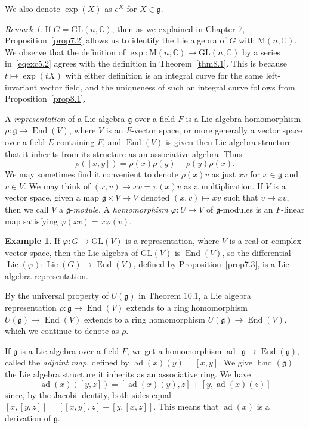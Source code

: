 \documentclass[12pt,reqno]{book}%
\theoremstyle{definition}
\newtheorem{example}{Example}[chapter]
\theoremstyle{remark}
\newtheorem{remark}[theorem]{Remark}
\theoremstyle{theorem}
\theoremstyle{remark}
\DeclareMathOperator{\End}{End}
\DeclareMathOperator{\Lie}{Lie}
\DeclareMathOperator{\ad}{ad}
\begin{document}
We also denote $\exp(X)$ as $e^X$ for $X \in \mathfrak{g}$.

\begin{remark}\label{}%
    If $G = \mathrm{GL}(n, \mathbb{C})$, then as we explained in Chapter 7, Proposition~\ref{prop7.2} allows us to identify the Lie algebra of $G$ with $\mathrm{M}(n, \mathbb{C})$.
    We observe that the definition of $\exp : \mathrm{M}(n, \mathbb{C}) \to \mathrm{GL}(n, \mathbb{C})$ by a series in~\eqref{eqexc5.2} agrees with the definition in Theorem~\ref{thm8.1}.
    This is because $t \mapsto \exp(tX)$ with either definition is an integral curve for the same left-invariant vector field, and the uniqueness of such an integral curve follows from Proposition~\ref{prop8.1}.
\end{remark}%

A \emph{representation} of a Lie algebra $\mathfrak{g}$ over a field $F$ is a Lie algebra homomorphism $\rho : \mathfrak{g} \to \End(V)$, where $V$ is an $F$-vector space, or more generally a vector space over a field $E$ containing $F$, and $\End(V)$ is given then Lie algebra structure that it inherits from its structure as an associative algebra.
Thus
\[
    \rho([x, y]) = \rho(x)\rho(y) - \rho(y)\rho(x).
\]
We may sometimes find it convenient to denote $\rho(x)v$ as just $xv$ for $x \in \mathfrak{g}$ and $v \in V$.
We may think of $(x, v) \mapsto xv = \pi(x)v$ as a multiplication.
If $V$ is a vector space, given a map $\mathfrak{g} \times V \to V$ denoted $(x, v) \mapsto xv$ such that $v \to xv$, then we call $V$ a $\mathfrak{g}$-\emph{module}.
A \emph{homomorphism} $\varphi : U \to V$ of $\mathfrak{g}$-modules is an $F$-linear map satisfying $\varphi(xv) = x\varphi(v)$.

\begin{example}\label{}
    If $\varphi : G \to \mathrm{GL}(V)$ is a representation, where $V$ is a real or complex vector space, then the Lie algebra of $\mathrm{GL}(V)$ is $\End(V)$, so the differential $\Lie(\varphi) : \Lie(G) \to \End(V)$, defined by Proposition~\ref{prop7.3}, is a Lie algebra representation.
\end{example}

By the universal property of $U(\mathfrak{g})$ in Theorem 10.1, a Lie algebra representation $\rho : \mathfrak{g} \to \End(V)$ extends to a ring homomorphism $U(\mathfrak{g}) \to \End(V)$ extends to a ring homomorphism $U(\mathfrak{g}) \to \End(V)$, which we continue to denote as $\rho$.

If $\mathfrak{g}$ is a Lie algebra over a field $F$, we get a homomorphism $\ad : \mathfrak{g} \to \End(\mathfrak{g})$, called the \emph{adjoint map}, defined by $\ad(x)(y) = [x, y]$.
We give $\End(\mathfrak{g})$ the Lie algebra structure it inherits as an associative ring.
We have
\begin{equation}\label{eq8.3}
    \ad(x)([y, z]) = [\ad(x)(y), z] + [y, \ad(x)(z)]
\end{equation}
since, by the Jacobi identity, both sides equal $[x, [y, z]] = [[x, y], z] + [y, [x, z]]$.
This means that $\ad(x)$ is a derivation of $\mathfrak{g}$.
\end{document}
